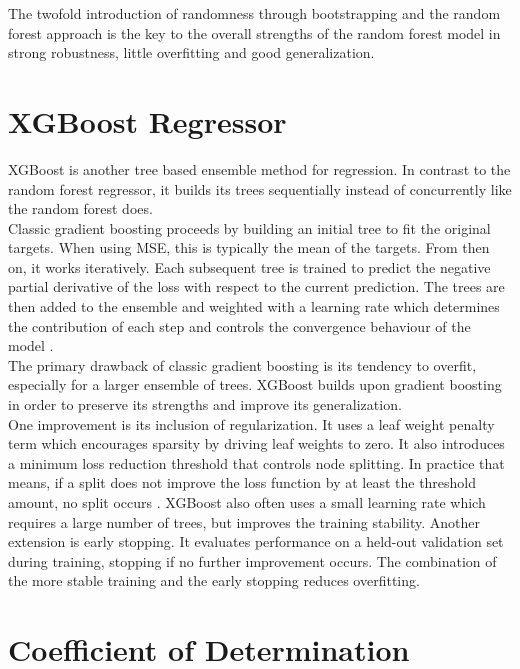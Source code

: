 The twofold introduction of randomness through bootstrapping and the random forest approach is the key to the overall strengths of the random forest model in strong robustness, little overfitting and good generalization.




\section{XGBoost Regressor}

XGBoost is another tree based ensemble method for regression. In contrast to the random forest regressor, it builds its trees sequentially instead of concurrently like the random forest does. \\
Classic gradient boosting proceeds by building an initial tree to fit the original targets. When using MSE, this is typically the mean of the targets. From then on, it works iteratively. Each subsequent tree is trained to predict the negative partial derivative of the loss with respect to the current prediction. The trees are then added to the ensemble and weighted with a learning rate which determines the contribution of each step and controls the convergence behaviour of the model \cite{chen_xgboost_2016}. \\
The primary drawback of classic gradient boosting is its tendency to overfit, especially for a larger ensemble of trees. XGBoost builds upon gradient boosting in order to preserve its strengths and improve its generalization. \\
One improvement is its inclusion of regularization. It uses a leaf weight penalty term which encourages sparsity by driving leaf weights to zero. It also introduces a minimum loss reduction threshold that controls node splitting. In practice that means, if a split does not improve the loss function by at least the threshold amount, no split occurs \cite{chen_xgboost_2016}. XGBoost also often uses a small learning rate which requires a large number of trees, but improves the training stability. Another extension is early stopping. It evaluates performance on a held-out validation set during training, stopping if no further improvement occurs. The combination of the more stable training and the early stopping reduces overfitting.




\section{Coefficient of Determination}


